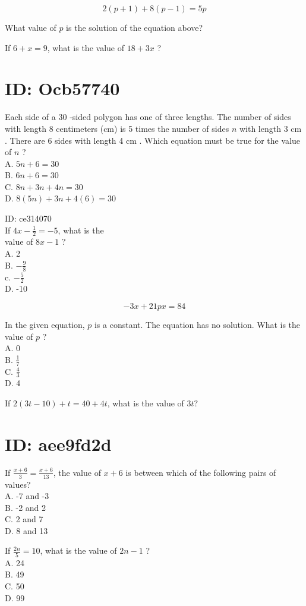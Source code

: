 $$
2(p+1)+8(p-1)=5 p
$$

What value of $p$ is the solution of the equation above?

If $6+x=9$, what is the value of $18+3 x$ ?

\section*{ID: Ocb57740}
Each side of a 30 -sided polygon has one of three lengths. The number of sides with length 8 centimeters (cm) is 5 times the number of sides $n$ with length 3 cm . There are 6 sides with length 4 cm . Which equation must be true for the value of $n$ ?\\
A. $5 n+6=30$\\
B. $6 n+6=30$\\
C. $8 n+3 n+4 n=30$\\
D. $8(5 n)+3 n+4(6)=30$

ID: ce314070\\
If $4 x-\frac{1}{2}=-5$, what is the\\
value of $8 x-1$ ?\\
A. 2\\
B. $-\frac{9}{8}$\\
c. $-\frac{5}{2}$\\
D. -10

$$
-3 x+21 p x=84
$$

In the given equation, $p$ is a constant. The equation has no solution. What is the value of $p$ ?\\
A. 0\\
B. $\frac{1}{7}$\\
C. $\frac{4}{3}$\\
D. 4

If $2(3 t-10)+t=40+4 t$, what is the value of $3 t ?$

\section*{ID: aee9fd2d}
If $\frac{x+6}{3}=\frac{x+6}{13}$, the value of $x+6$ is between which of the following pairs of values?\\
A. -7 and -3\\
B. -2 and 2\\
C. 2 and 7\\
D. 8 and 13

If $\frac{2 n}{5}=10$, what is the value of $2 n-1$ ?\\
A. 24\\
B. 49\\
C. 50\\
D. 99

